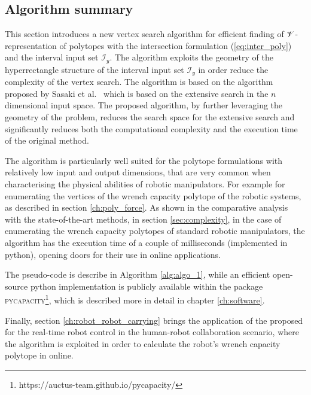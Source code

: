 \subsection{Algorithm summary}
This section introduces a new vertex search algorithm for efficient finding of $\mathscr{V}$-representation of polytopes with the intersection formulation (\ref{eq:inter_poly}) and the interval input set $\mathcal{I}_y$. The algorithm exploits the geometry of the hyperrectangle structure of the interval input set $\mathcal{I}_y$ in order reduce the complexity of the vertex search. The algorithm is based on the algorithm proposed by Sasaki et al.~\cite{sasaki2011vertex} which is based on the extensive search in the $n$ dimensional input space. The proposed algorithm, by further leveraging the geometry of the problem, reduces the search space for the extensive search and significantly reduces both the computational complexity and the execution time of the original method.

The algorithm is particularly well suited for the polytope formulations with relatively low input and output dimensions, that are very common when characterising the physical abilities of robotic manipulators. For example for enumerating the vertices of the wrench capacity polytope of the robotic systems, as described in section \ref{ch:poly_force}. As shown in the comparative analysis with the state-of-the-art methods, in section \ref{sec:complexity},  in the case of enumerating the wrench capacity polytopes of standard robotic manipulators, the algorithm has the execution time of a couple of milliseconds (implemented in python), opening doors for their use in online applications.

The pseudo-code is describe in Algorithm \ref{alg:algo_1}, while an efficient open-source python implementation is publicly available within the package \textsc{pycapacity}\footnote{https://auctus-team.github.io/pycapacity/}, which is described more in detail in chapter \ref{ch:software}.

Finally, section \ref{ch:robot_robot_carrying} brings the application of the proposed for the real-time robot control in the human-robot collaboration scenario, where the algorithm is exploited in order to calculate the robot's wrench capacity polytope in online. 

